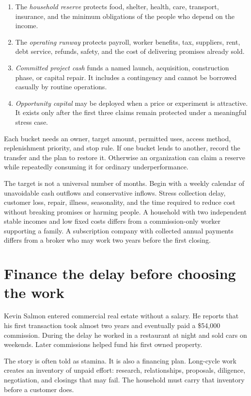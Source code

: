 \begin{enumerate}[itemsep=0.13em]
\item The \emph{household reserve} protects food, shelter, health, care,
  transport, insurance, and the minimum obligations of the people who depend
  on the income.
\item The \emph{operating runway} protects payroll, worker benefits, tax,
  suppliers, rent, debt service, refunds, safety, and the cost of delivering
  promises already sold.
\item \emph{Committed project cash} funds a named launch, acquisition,
  construction phase, or capital repair. It includes a contingency and cannot
  be borrowed casually by routine operations.
\item \emph{Opportunity capital} may be deployed when a price or experiment is
  attractive. It exists only after the first three claims remain protected
  under a meaningful stress case.
\end{enumerate}

Each bucket needs an owner, target amount, permitted uses, access method,
replenishment priority, and stop rule. If one bucket lends to another, record
the transfer and the plan to restore it. Otherwise an organization can claim a
reserve while repeatedly consuming it for ordinary underperformance.

The target is not a universal number of months. Begin with a weekly calendar
of unavoidable cash outflows and conservative inflows. Stress collection
delay, customer loss, repair, illness, seasonality, and the time required to
reduce cost without breaking promises or harming people. A household with two
independent stable incomes and low fixed costs differs from a commission-only
worker supporting a family. A subscription company with collected annual
payments differs from a broker who may work two years before the first closing.

\section{Finance the delay before choosing the work}

Kevin Salmon entered commercial real estate without a salary. He reports that
his first transaction took almost two years and eventually paid a \$54,000
commission. During the delay he worked in a restaurant at night and sold cars
on weekends. Later commissions helped fund his first owned property.

The story is often told as stamina. It is also a financing plan. Long-cycle work
creates an inventory of unpaid effort: research, relationships, proposals,
diligence, negotiation, and closings that may fail. The household must carry
that inventory before a customer does.

